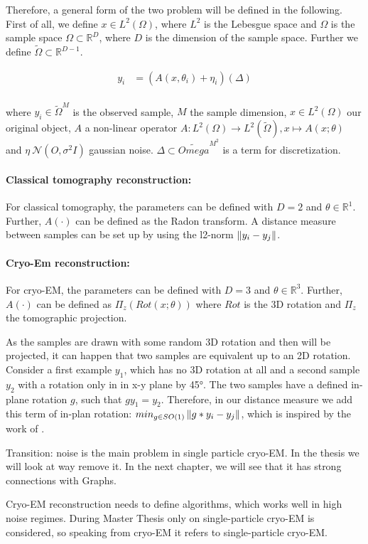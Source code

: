 Therefore, a general form of the two problem will be defined in the following.
First of all, we define $x \in L^2(\Omega)$, where $L^2$ is the Lebesgue space and $\Omega$
is the sample space $\Omega \subset \mathbb{R}^D$, where $D$ is the dimension of the sample space. 
Further we define $\tilde{\Omega} \subset \mathbb{R}^{D-1}$.

\begin{equation}
    \begin{aligned}
        y_i &= \left( A(x, \theta_i) + \eta_i \right) (\Delta)\\
    \end{aligned}
\end{equation}

where $y_i \in \tilde{\Omega}^M$ is the observed sample, $M$ the sample dimension, $x \in L^2(\Omega)$ our original object, $A$ a non-linear operator 
$A: L^2(\Omega) \to L^2(\tilde{\Omega}), x \mapsto A(x; \theta)$ and
$\eta ~ \mathcal{N}(O, \sigma^2 I)$ gaussian noise. $\Delta \subset \tilde{Omega}^{M^2}$ is a term for discretization.

\paragraph{Classical tomography reconstruction:}

For classical tomography, the parameters can be defined with $D=2$ and $\theta \in \mathbb{R}^1$.
Further, $A(\cdot)$ can be defined as the Radon transform.
A distance measure between samples can be set up by using the l2-norm $\left\lVert y_i - y_j\right\rVert$.

\paragraph{Cryo-Em reconstruction:}
For cryo-EM, the parameters can be defined with $D=3$ and $\theta \in \mathbb{R}^3$.
Further, $A(\cdot)$ can be defined as $\Pi_z \left( Rot(x; \theta) \right)$ 
where $Rot$ is the 3D rotation and $\Pi_z$ the tomographic projection.

As the samples are drawn with some random 3D rotation and then will be projected, it can 
happen that two samples are equivalent up to an 2D rotation. 
Consider a first example $y_1$, which has no 3D rotation at all and 
a second sample $y_2$ with a rotation only in in x-y plane by 45°.
The two samples have a defined in-plane rotation $g$, such that $g y_1 = y_2$.
Therefore, in our distance measure we add this term of in-plan rotation: $min_{g \in SO(1)}\left\lVert g * y_i - y_j\right\rVert$, 
which is inspired by the work of \cite{multiDiffusionMaps}. 


Transition: noise is the main problem in single particle cryo-EM. In the thesis we will look at way remove it. 
In the next chapter, we will see that it has strong connections with Graphs.

\begin{tcolorbox}[colback=red!5!white,colframe=red!75!black]
    Cryo-EM reconstruction needs to define algorithms, which works well in high noise regimes.
    During Master Thesis only on single-particle cryo-EM is considered, so speaking from cryo-EM 
    it refers to single-particle cryo-EM.
\end{tcolorbox}
